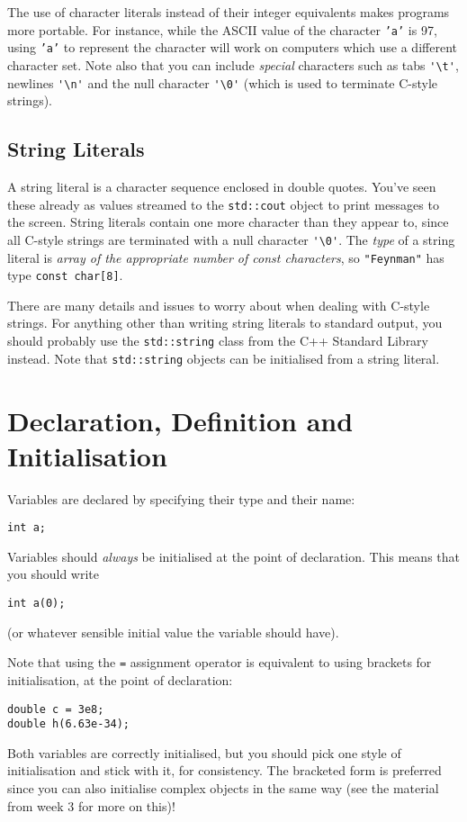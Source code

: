 \documentclass[a4paper]{scrartcl}
\begin{document}
The use of character literals instead of their integer equivalents makes programs more portable. For instance, while the ASCII value of the character \texttt{'a'} is 97, using \texttt{'a'} to represent the character will work on computers which use a different character set. Note also that you can include \emph{special} characters such as tabs \verb|'\t'|, newlines \verb|'\n'| and the null character \verb|'\0'| (which is used to terminate C-style strings).

\subsection{String Literals}
A string literal is a character sequence enclosed in double quotes. You've seen these already as values streamed to the \texttt{std::cout} object to print messages to the screen. String literals contain one more character than they appear to, since all C-style strings are terminated with a null character \verb|'\0'|. The \emph{type} of a string literal is \emph{array of the appropriate number of \emph{const} characters}, so \texttt{"Feynman"} has type \texttt{const char[8]}.

There are many details and issues to worry about when dealing with C-style strings. For anything other than writing string literals to standard output, you should probably use the \texttt{std::string} class from the C++ Standard Library\cite{StandardLibrary} instead. Note that \texttt{std::string} objects can be initialised from a string literal.

\section{Declaration, Definition and Initialisation}
Variables are declared by specifying their type and their name:
\begin{verbatim}
int a;
\end{verbatim}
Variables should \emph{always} be initialised at the point of declaration. This means that you should write 
\begin{verbatim}
int a(0);
\end{verbatim}
(or whatever sensible initial value the variable should have).

Note that using the \texttt{=} assignment operator is equivalent to using brackets for initialisation, at the point of declaration:
\begin{verbatim}
double c = 3e8;
double h(6.63e-34);
\end{verbatim}
Both variables are correctly initialised, but you should pick one style of initialisation and stick with it, for consistency. The bracketed form is preferred since you can also initialise complex objects in the same way (see the material from week 3 for more on this)!
\end{document}
